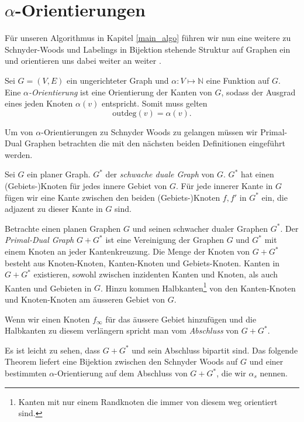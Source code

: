 \section{$\alpha$-Orientierungen}\label{alpha_orientations}

Für unseren Algorithmus in Kapitel \ref{main_algo} führen wir nun eine weitere zu Schnyder-Woods und Labelings in Bijektion stehende Struktur auf Graphen ein und orientieren uns dabei weiter an weiter \cite{felsner04}.

\begin{definition}
Sei $G=(V,E)$ ein ungerichteter Graph und $\alpha:V\mapsto\mathbb{N}$ eine Funktion auf $G$. Eine $\alpha$\textit{-Orientierung} ist eine Orientierung der Kanten von $G$, sodass der Ausgrad eines jeden Knoten $\alpha(v)$ entspricht. Somit muss gelten $$\text{outdeg}(v) = \alpha(v).$$
\end{definition}

Um von $\alpha$-Orientierungen zu Schnyder Woods zu gelangen müssen wir Primal-Dual Graphen betrachten die mit den nächsten beiden Definitionen eingeführt werden.

\begin{definition}
Sei $G$ ein planer Graph. $G^*$ der \textit{schwache duale Graph} von $G$. $G^*$ hat einen (Gebiets-)Knoten für jedes innere Gebiet von $G$. Für jede innerer Kante in $G$ fügen wir eine Kante zwischen den beiden (Gebiets-)Knoten $f,f'$ in $G^*$ ein, die adjazent zu dieser Kante in $G$ sind.
\end{definition}

\begin{definition}
Betrachte einen planen Graphen $G$ und seinen schwacher dualer Graphen $G^*$. Der \textit{Primal-Dual Graph} $G+G^*$ ist eine Vereinigung der Graphen $G$ und $G^*$ mit einem Knoten an jeder Kantenkreuzung. Die Menge der Knoten von $G+G^*$ besteht aus Knoten-Knoten, Kanten-Knoten und Gebiets-Knoten. Kanten in $G+G^*$ existieren, sowohl zwischen inzidenten Kanten und Knoten, als auch Kanten und Gebieten in $G$. Hinzu kommen Halbkanten\footnote{Kanten mit nur einem Randknoten die immer von diesem weg orientiert sind.} von den Kanten-Knoten und Knoten-Knoten am äusseren Gebiet von $G$.

Wenn wir einen Knoten $f_\infty$ für das äussere Gebiet hinzufügen und die Halbkanten zu diesem verlängern spricht man vom \textit{Abschluss} von $G+G^*$.

\end{definition}
Es ist leicht zu sehen, dass $G+G^*$ und sein Abschluss bipartit sind. Das folgende Theorem liefert eine Bijektion zwischen den Schnyder Woods auf $G$ und einer bestimmten $\alpha$-Orientierung auf dem Abschluss von $G+G^*$, die wir $\alpha_s$ nennen.

